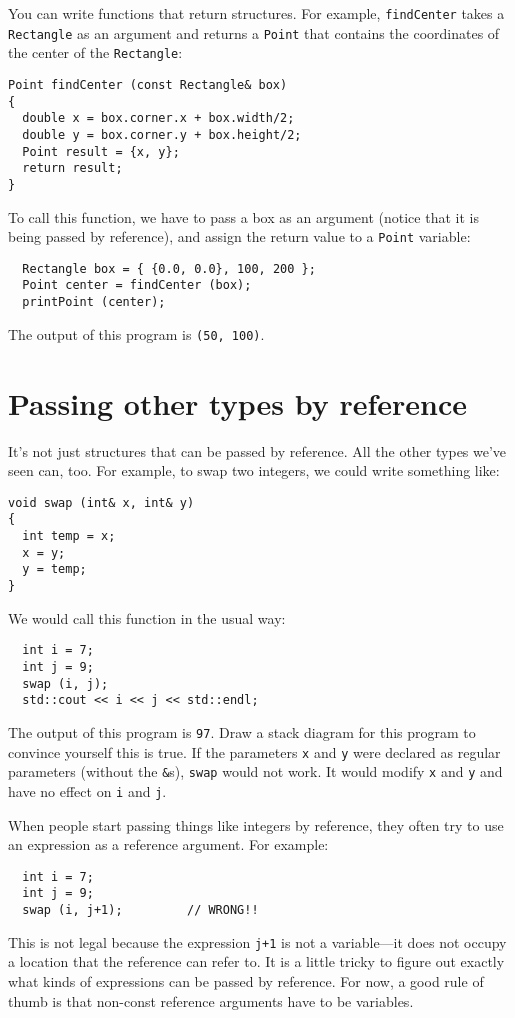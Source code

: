 You can write functions that return structures.  For example,
{\tt findCenter} takes a {\tt Rectangle} as an argument and
returns a {\tt Point} that contains the coordinates of the
center of the {\tt Rectangle}:

\begin{verbatim}
Point findCenter (const Rectangle& box)
{
  double x = box.corner.x + box.width/2;
  double y = box.corner.y + box.height/2;
  Point result = {x, y};
  return result;
}
\end{verbatim}
%
To call this function, we have to pass a box as an argument
(notice that it is being passed by reference), and assign the
return value to a {\tt Point} variable:

\begin{verbatim}
  Rectangle box = { {0.0, 0.0}, 100, 200 };
  Point center = findCenter (box);
  printPoint (center);
\end{verbatim}
%
The output of this program is {\tt (50, 100)}.

\section {Passing other types by reference}

It's not just structures that can be passed by reference.
All the other types we've seen can, too.  For example, to swap
two integers, we could write something like:

\begin{verbatim}
void swap (int& x, int& y)
{
  int temp = x;
  x = y;
  y = temp;
}
\end{verbatim}
%
We would call this function in the usual way:

\begin{verbatim}
  int i = 7;
  int j = 9;
  swap (i, j);
  std::cout << i << j << std::endl;
\end{verbatim}
%
The output of this program is {\tt 97}.  Draw a stack
diagram for this program to convince yourself this is true.
If the parameters {\tt x} and {\tt y} were declared as
regular parameters (without the {\tt \&}s), {\tt swap} would
not work.  It would modify {\tt x} and {\tt y} and have no
effect on {\tt i} and {\tt j}.

When people start passing things like integers by reference,
they often try to use an expression
as a reference argument.  For example:

\begin{verbatim}
  int i = 7;
  int j = 9;
  swap (i, j+1);         // WRONG!!
\end{verbatim}
%
This is not legal because the expression {\tt j+1} is not
a variable---it does not occupy a location that the reference
can refer to.  It is a little tricky to figure out exactly
what kinds of expressions can be passed by reference.  For now,
a good rule of thumb is that non-const reference arguments have to be
variables.

